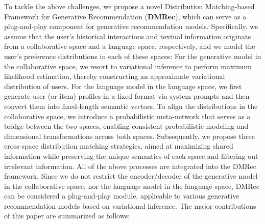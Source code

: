 \documentclass[sigconf]{acmart}
\begin{document}

To tackle the above challenges, we propose a novel Distribution Matching-based Framework for Generative Recommendation (\textbf{\textsf{DMRec}}), which can serve as a plug-and-play component for generative recommendation models. Specifically, we assume that the user's historical interactions and textual information originate from a collaborative space and a language space, respectively, and we model the user's preference distributions in each of these spaces: For the generative model in the collaborative space, we resort to variational inference \cite{kingma2013auto} to perform maximum likelihood estimation, thereby constructing an approximate variational distribution of users. For the language model in the language space, we first generate user (or item) profiles in a fixed format via system prompts and then convert them into fixed-length semantic vectors. To align the distributions in the collaborative space, we introduce a probabilistic meta-network that serves as a bridge between the two spaces, enabling consistent probabilistic modeling and dimensional transformations across both spaces. 
Subsequently, we propose three cross-space distribution matching strategies, aimed at maximizing shared information while preserving the unique semantics of each space and filtering out irrelevant information. All of the above processes are integrated into the \textsf{DMRec} framework. Since we do not restrict the encoder/decoder of the generative model in the collaborative space, nor the language model in the language space, \textsf{DMRec} can be considered a plug-and-play module, applicable to various generative recommendation models based on variational inference. The major contributions of this paper are summarized as follows:
\end{document}
